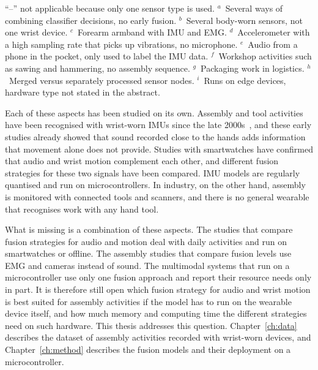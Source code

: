 \begin{table}[!ht]
\vspace{1mm}
{\footnotesize\raggedright
``--'' not applicable because only one sensor type is used.
$^{a}$~Several ways of combining classifier decisions, no early fusion.
$^{b}$~Several body-worn sensors, not one wrist device.
$^{c}$~Forearm armband with IMU and EMG.
$^{d}$~Accelerometer with a high sampling rate that picks up vibrations, no microphone.
$^{e}$~Audio from a phone in the pocket, only used to label the IMU data.
$^{f}$~Workshop activities such as sawing and hammering, no assembly sequence.
$^{g}$~Packaging work in logistics.
$^{h}$~Merged versus separately processed sensor nodes.
$^{i}$~Runs on edge devices, hardware type not stated in the abstract.\par}
\caption{Comparison of closely related work.}
\label{tab:sota-comparison}
\end{table}

Each of these aspects has been studied on its own. Assembly and tool
activities have been recognised with wrist-worn IMUs since the late
2000s~\cite{ward2006activity, koskimaki2009activity}, and these early
studies already showed that sound recorded close to the hands adds information
that movement alone does not provide. Studies with smartwatches have confirmed that audio and wrist motion
complement each other, and different fusion strategies for these two signals
have been compared. IMU models are regularly quantised and run on
microcontrollers. In industry, on the other hand, assembly is monitored with
connected tools and scanners, and there is no general wearable that recognises
work with any hand tool.

What is missing is a combination of these aspects. The studies that compare
fusion strategies for audio and motion deal with daily activities and run on
smartwatches or offline. The assembly studies that compare fusion levels use
EMG and cameras instead of sound. The multimodal systems that run on a
microcontroller use only one fusion approach and report their resource needs
only in part. It is therefore still open which fusion strategy for audio and
wrist motion is best suited for assembly activities if the model has to run on
the wearable device itself, and how much memory and computing time the
different strategies need on such hardware. This thesis addresses this
question. Chapter~\ref{ch:data} describes the dataset of assembly activities
recorded with wrist-worn devices, and Chapter~\ref{ch:method} describes the
fusion models and their deployment on a microcontroller.
